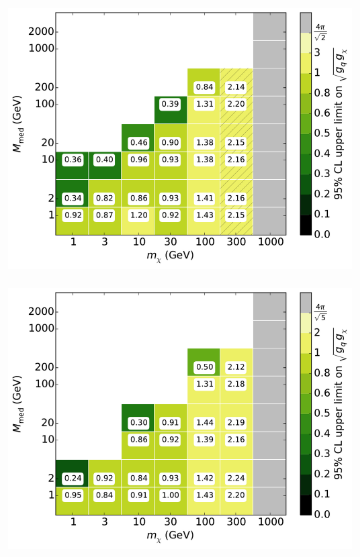 \begin{figure}[h]
\begin{subfigure}[t]{0.495\textwidth}
      \includegraphics[width=1.\textwidth]{figures/grid_allpoints_SVD_rat2.pdf}
    \end{subfigure}
    \begin{subfigure}[t]{0.495\textwidth}
      \centering
      \includegraphics[width=1.\textwidth]{figures/grid_allpoints_SVD_rat5.pdf}
    \end{subfigure}
    \begin{subfigure}[t]{0.495\textwidth}
      \centering

\end{subfigure}
\end{figure}
